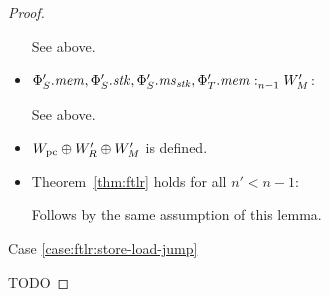 \begin{proof}
\begin{itemize}
    See above.

  \item $\memSat[n-1]{\Phi_S'.\mem,\Phi_S'.\stk,\Phi_S'.\ms_\stk,\Phi_T'.\mem}{W_M'}$:

    See above.

  \item $W_\pcreg \oplus W_R' \oplus W_M'$ is defined.

  \item Theorem~\ref{thm:ftlr} holds for all $n' < n-1$:

    Follows by the same assumption of this lemma.
  \end{itemize}

  Case \ref{case:ftlr:store-load-jump}

  TODO
\end{proof}

